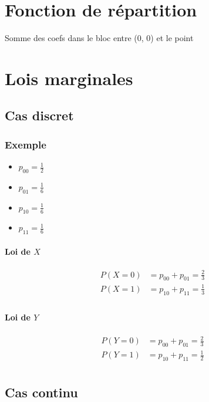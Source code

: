 \documentclass{article}
\begin{document}
\section{Fonction de répartition}

Somme des coefs dans le bloc entre (0, 0) et le point

\section{Lois marginales}
\subsection{Cas discret}

\subsubsection{Exemple}

\begin{itemize}
	\item $p_{00} = \frac{1}{2}$
	 \item $p_{01}= \frac{1}{6}$
		\item $p_{10} = \frac{1}{6}$
	\item $p_{11} = \frac{1}{6}$
\end{itemize}

\paragraph{Loi de $X$}

\begin{align*}
	P(X=0) &= p_{00} + p_{01} = \frac{2}{3} \\
	P(X=1) &= p_{10} + p_{11} = \frac{1}{3} \\
\end{align*}

\paragraph{Loi de $Y$}

\begin{align*}
	P(Y=0) &= p_{00} + p_{01} = \frac{2}{3} \\
	P(Y=1) &= p_{10} + p_{11} = \frac{1}{2} \\
\end{align*}



\subsection{Cas continu}
\end{document}
